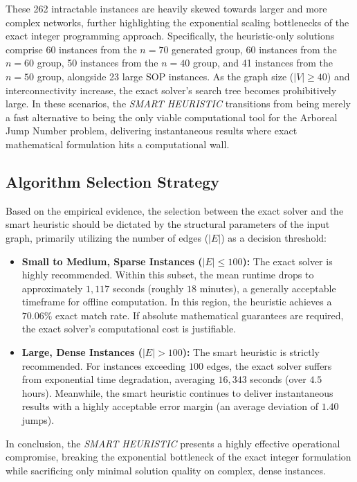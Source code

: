 These 262 intractable instances are heavily skewed towards larger and more complex networks, further highlighting the exponential scaling bottlenecks of the exact integer programming approach. Specifically, the heuristic-only solutions comprise 60 instances from the $n=70$ generated group, 60 instances from the $n=60$ group, 50 instances from the $n=40$ group, and 41 instances from the $n=50$ group, alongside 23 large SOP instances. As the graph size ($|V| \ge 40$) and interconnectivity increase, the exact solver's search tree becomes prohibitively large. In these scenarios, the \textit{SMART HEURISTIC} transitions from being merely a fast alternative to being the only viable computational tool for the Arboreal Jump Number problem, delivering instantaneous results where exact mathematical formulation hits a computational wall.

\subsection{Algorithm Selection Strategy}

Based on the empirical evidence, the selection between the exact solver and the smart heuristic should be dictated by the structural parameters of the input graph, primarily utilizing the number of edges ($|E|$) as a decision threshold:

\begin{itemize}
    \item \textbf{Small to Medium, Sparse Instances ($|E| \le 100$):} The exact solver is highly recommended. Within this subset, the mean runtime drops to approximately $1,117$ seconds (roughly $18$ minutes), a generally acceptable timeframe for offline computation. In this region, the heuristic achieves a $70.06\%$ exact match rate. If absolute mathematical guarantees are required, the exact solver's computational cost is justifiable.
    
    \item \textbf{Large, Dense Instances ($|E| > 100$):} The smart heuristic is strictly recommended. For instances exceeding $100$ edges, the exact solver suffers from exponential time degradation, averaging $16,343$ seconds (over $4.5$ hours). Meanwhile, the smart heuristic continues to deliver instantaneous results with a highly acceptable error margin (an average deviation of $1.40$ jumps). 
\end{itemize}

In conclusion, the \textit{SMART HEURISTIC} presents a highly effective operational compromise, breaking the exponential bottleneck of the exact integer formulation while sacrificing only minimal solution quality on complex, dense instances.